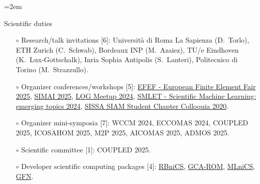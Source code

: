 \documentclass[
  usegeometry%
]{scrartcl}
\newcommand{\Description}[1]{\hangindent=2em\hangafter=0\noindent\raggedright\footnotesize{#1}\par\normalsize\vspace{1em}} %
\begin{document}
\begin{cv}{}
\newpage
\Description{{\color{cyan} Scientific duties}
\begin{itemize}
    \item[$\circ$] Research/talk invitations [6]: Università di Roma La Sapienza (D.\ Torlo), ETH Zurich (C.\ Schwab), Bordeaux INP (M.\ Azaiez), TU/e Eindhoven (K.\ Lux-Gottschalk), Inria Sophia Antipolis (S.\ Lanteri), Politecnico di Torino (M.\ Strazzullo).
    \item[$\circ$] Organizer conferences/workshops [5]: \href{https://indico.sissa.it/event/153/}{EFEF - European Finite Element Fair 2025}, \href{https://simai2025.cimne.com}{SIMAI 2025}, \href{https://sites.google.com/student.unisi.it/log24siena/home-page}{LOG Meetup 2024}, \href{https://indico.sissa.it/event/107/}{SMLET - Scientific Machine Learning: emerging topics 2024}, \href{https://www.math.sissa.it/seminar/siam-chapter-colloquia-2020}{SISSA SIAM Student Chapter Colloquia 2020}.
    \item[$\circ$] Organizer mini-symposia [7]: WCCM 2024, ECCOMAS 2024, COUPLED 2025, ICOSAHOM 2025, M2P 2025, AICOMAS 2025, ADMOS 2025.
    \item[$\circ$] Scientific committee [1]:  COUPLED 2025.
    \item[$\circ$] Developer scientific computing packages [4]: \href{https://github.com/RBniCS/RBniCS}{RBniCS}, \href{https://github.com/fpichi/gca-rom}{GCA-ROM}, \href{https://github.com/MLniCS/MLniCS}{MLniCS}, \href{https://github.com/Oisin-M/GFN}{GFN}. 

\end{itemize}}
\end{cv}
\end{document}
